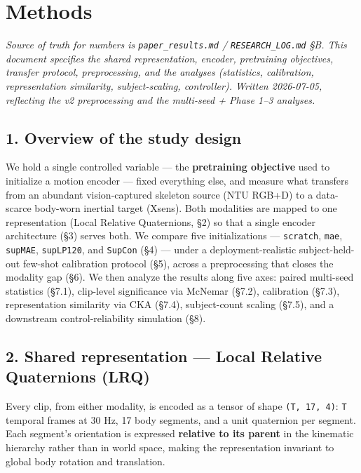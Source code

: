 \section{Methods}

\textit{Source of truth for numbers is \texttt{paper\_results.md} / \texttt{RESEARCH\_LOG.md} \S{}B. This document specifies the shared representation, encoder, pretraining objectives, transfer protocol, preprocessing, and the analyses (statistics, calibration, representation similarity, subject-scaling, controller). Written 2026-07-05, reflecting the v2 preprocessing and the multi-seed + Phase 1--3 analyses.}

\subsection{1. Overview of the study design}

We hold a single controlled variable --- the \textbf{pretraining objective} used to initialize a motion encoder --- fixed everything else, and measure what transfers from an abundant vision-captured skeleton source (NTU RGB+D) to a data-scarce body-worn inertial target (Xsens). Both modalities are mapped to one representation (Local Relative Quaternions, \S{}2) so that a single encoder architecture (\S{}3) serves both. We compare five initializations --- \texttt{scratch}, \texttt{mae}, \texttt{supMAE}, \texttt{supLP120}, and \texttt{SupCon} (\S{}4) --- under a deployment-realistic subject-held-out few-shot calibration protocol (\S{}5), across a preprocessing that closes the modality gap (\S{}6). We then analyze the results along five axes: paired multi-seed statistics (\S{}7.1), clip-level significance via McNemar (\S{}7.2), calibration (\S{}7.3), representation similarity via CKA (\S{}7.4), subject-count scaling (\S{}7.5), and a downstream control-reliability simulation (\S{}8).

\subsection{2. Shared representation --- Local Relative Quaternions (LRQ)}

Every clip, from either modality, is encoded as a tensor of shape \texttt{(T, 17, 4)}: \texttt{T} temporal frames at 30 Hz, 17 body segments, and a unit quaternion per segment. Each segment's orientation is expressed \textbf{relative to its parent} in the kinematic hierarchy rather than in world space, making the representation invariant to global body rotation and translation.

